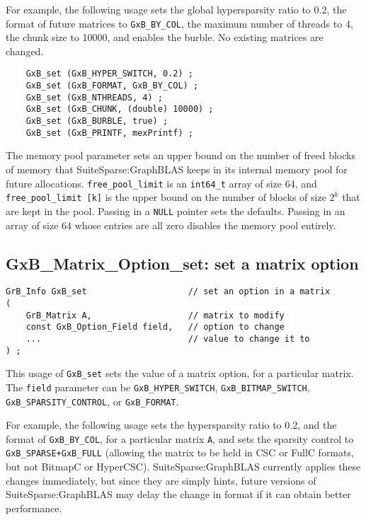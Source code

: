 \documentclass[12pt]{article}
\begin{document}
For example, the following usage sets the global hypersparsity ratio to 0.2,
the format of future matrices to \verb'GxB_BY_COL', the maximum number
of threads to 4, the chunk size to 10000, and enables the burble.
No existing matrices are changed.

{\footnotesize
\begin{verbatim}
    GxB_set (GxB_HYPER_SWITCH, 0.2) ;
    GxB_set (GxB_FORMAT, GxB_BY_COL) ;
    GxB_set (GxB_NTHREADS, 4) ;
    GxB_set (GxB_CHUNK, (double) 10000) ;
    GxB_set (GxB_BURBLE, true) ;
    GxB_set (GxB_PRINTF, mexPrintf) ;
\end{verbatim} }

The memory pool parameter sets an upper bound on the number of freed blocks of
memory that SuiteSparse:GraphBLAS keeps in its internal memory pool for future
allocations.   \verb'free_pool_limit'  is an \verb'int64_t' array of size 64,
and \verb'free_pool_limit [k]' is the upper bound on the number of blocks
of size $2^k$ that are kept in the pool.  Passing in a \verb'NULL' pointer
sets the defaults.  Passing in an array of size 64 whose entries are all zero
disables the memory pool entirely.

\subsection{{\sf GxB\_Matrix\_Option\_set:} set a matrix option}

\begin{mdframed}[userdefinedwidth=6in]
{\footnotesize
\begin{verbatim}
GrB_Info GxB_set                    // set an option in a matrix
(
    GrB_Matrix A,                   // matrix to modify
    const GxB_Option_Field field,   // option to change
    ...                             // value to change it to
) ;
\end{verbatim} } \end{mdframed}

This usage of \verb'GxB_set' sets the value of a matrix option, for a
particular matrix.
The \verb'field' parameter can be
\verb'GxB_HYPER_SWITCH',
\verb'GxB_BITMAP_SWITCH',
\verb'GxB_SPARSITY_CONTROL', or
\verb'GxB_FORMAT'.

For example, the following usage sets the hypersparsity ratio to 0.2, and the
format of \verb'GxB_BY_COL', for a particular matrix \verb'A', and sets the
sparsity control to \verb'GxB_SPARSE+GxB_FULL' (allowing the matrix to be held
in CSC or FullC formats, but not BitmapC or HyperCSC).  SuiteSparse:GraphBLAS
currently applies these changes immediately, but since they are simply hints,
future versions of SuiteSparse:GraphBLAS may delay the change in format if it
can obtain better performance.
\end{document}
